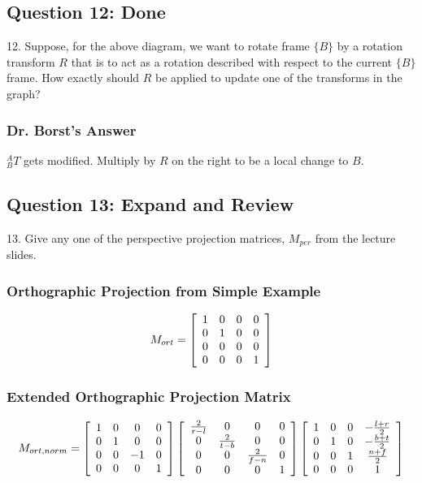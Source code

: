 \documentclass[11pt]{article}
\begin{document}
\begin{spacing}{1.2}
\subsection{Question 12:  Done}
12.  Suppose, for the above diagram, we want to rotate frame $\{B\}$ by a rotation transform $R$ that is to act as a rotation described with respect to the  current $\{B\}$ frame.  How exactly should $R$ be applied to update one of the transforms in the graph?

\subsubsection{Dr. Borst's Answer}

$^A_BT$ gets modified.  Multiply by $R$ on the right to be a local change to $B$.  


\subsection{Question 13:  Expand and Review}
13.  Give any one of the perspective projection matrices, $M_{per}$ from the lecture slides.  

\subsubsection{Orthographic Projection from Simple Example}

$$M_{ort} = 
\left[
	\begin{array}{cccc}
		1 & 0 & 0 & 0 \cr
		0 & 1 & 0 & 0 \cr
		0 & 0 & 0 & 0 \cr
		0 & 0 & 0 & 1 \cr
	\end{array}
\right]
$$

\subsubsection{Extended Orthographic Projection Matrix}

$$M_{ort,norm} = 
\left[
	\begin{array}{cccc}
		1 & 0 & 0 & 0 \cr
		0 & 1 & 0 & 0 \cr
		0 & 0 & -1 & 0 \cr
		0 & 0 & 0 & 1 \cr
	\end{array}
\right]
\left[
	\begin{array}{cccc}
		\frac{2}{r-l} & 0 & 0 & 0 \cr
		0 & \frac{2}{t-b} & 0 & 0 \cr
		0 & 0 & \frac{2}{f-n} & 0 \cr
		0 & 0 & 0 & 1 \cr
	\end{array}
\right]
\left[
	\begin{array}{cccc}
		1 & 0 & 0  & -\frac{l+r}{2} \cr
		0 & 1 & 0 & -\frac{b+t}{2} \cr
		0 & 0 & 1 & \frac{n+f}{2} \cr
		0 & 0 & 0 & 1 \cr
	\end{array}
\right]
$$


\end{spacing}
\end{document}
